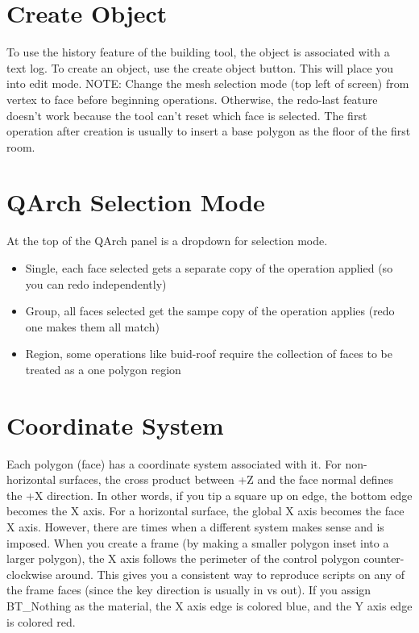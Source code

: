 \documentclass[11pt]{article}
\begin{document}
    \section{Create Object}
    To use the history feature of the building tool, the object is associated with a text log.
    To create an object, use the create object button.
    This will place you into edit mode.
    NOTE: Change the mesh selection mode (top left of screen) from vertex to face before beginning operations.
    Otherwise, the redo-last feature doesn't work because the tool can't reset which face is selected.
    The first operation after creation is usually to insert a base polygon as the floor of the first room.

    \section{QArch Selection Mode}
    At the top of the QArch panel is a dropdown for selection mode.
    \begin{itemize}
        \item Single, each face selected gets a separate copy of the operation applied (so you can redo independently)
        \item Group, all faces selected get the sampe copy of the operation applies (redo one makes them all match)
        \item Region, some operations like buid-roof require the collection of faces to be treated as a one polygon region
    \end{itemize}

    \section{Coordinate System}
    Each polygon (face) has a coordinate system associated with it.
    For non-horizontal surfaces, the cross product between +Z and the face normal defines the +X direction.
    In other words, if you tip a square up on edge, the bottom edge becomes the X axis.
    For a horizontal surface, the global X axis becomes the face X axis.
    However, there are times when a different system makes sense and is imposed.
    When you create a frame (by making a smaller polygon inset into a larger polygon),
    the X axis follows the perimeter of the control polygon counter-clockwise around.
    This gives you a consistent way to reproduce scripts on any of the frame faces
    (since the key direction is usually in vs out).
    If you assign BT\_Nothing as the material, the X axis edge is colored blue, and the Y axis edge is colored red.
\end{document}
